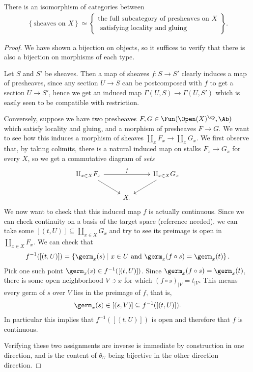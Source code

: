 \documentclass[11pt]{book}
\begin{document}
\begin{corollary}\label{cor:espace-etale-isomorphism-of-cats} 
There is an isomorphism of categories between
\begin{align*}
    \left\{ \text{sheaves on }X \right\} \simeq \left\{ \substack{\text{the full subcategory of presheaves on }X \\ \text{ satisfying locality and gluing}} \right\}.
\end{align*}
\end{corollary}
\begin{proof} We have shown a bijection on objects, so it suffices to verify that there is also a bijection on morphisms of each type.

Let $S$ and $S'$ be sheaves. Then a map of sheaves $f \colon S \to S'$ clearly induces a map of presheaves, since any section $U \to S$ can be postcomposed with $f$ to get a section $U \to S'$, hence we get an induced map $\Gamma(U,S) \to \Gamma(U,S')$ which is easily seen to be compatible with restriction.

Conversely, suppose we have two presheaves $F,G \in \Fun(\Open(X)^\op,\Ab)$ which satisfy locality and gluing, and a morphism of presheaves $F \to G$. We want to see how this induces a morphism of sheaves $\amalg_x F_x \to \amalg_x G_x$. We first observe that, by taking colimits, there is a natural induced map on stalks $F_x \to G_x$ for every $X$, so we get a commutative diagram of \emph{sets}
\[ \begin{tikzcd}
    \amalg_{x\in X}F_x \ar[rr,"f"]\ar[dr] &  & \amalg_{x\in X}G_x\ar[dl]\\
     & X. & 
\end{tikzcd} \]
We now want to check that this induced map $f$ is actually continuous. Since we can check continuity on a basis of the target space (reference needed), we can take some $[(t,U)] \subseteq \amalg_{x\in X}G_x$ and try to see its preimage is open in $\amalg_{x\in X}F_x$. We can check that
\begin{align*}
    f^{-1}([(t,U)]) = \left\{ \germ_x(s)  \mid x\in U \text{ and } \germ_x(f\circ s) = \germ_x(t) \right\}.
\end{align*}
Pick one such point $\germ_x(s) \in f^{-1}([(t,U)])$. Since $\germ_x(f\circ s) = \germ_x(t)$, there is some open neighborhood $V \ni x$ for which $(f\circ s)_{|V} = t_{|V}$. This means every germ of $s$ over $V$ lies in the preimage of $f$, that is,
\begin{align*}
    \germ_x(s) \in [(s,V)] \subseteq f^{-1}([(t,U)]).
\end{align*}
In particular this implies that $f^{-1}([(t,U)])$ is open and therefore that $f$ is continuous.

Verifying these two assignments are inverse is immediate by construction in one direction, and is the content of $\theta_U$ being bijective in the other direction direction.
\end{proof}
\end{document}
